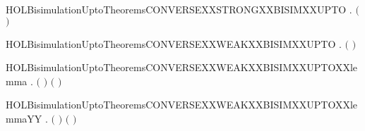 \newcommand{\HOLBisimulationUptoTheoremsCONVERSEXXOBSXXBISIMXXUPTO}{\UseVerbatim{HOLBisimulationUptoTheoremsCONVERSEXXOBSXXBISIMXXUPTO}}
\begin{SaveVerbatim}{HOLBisimulationUptoTheoremsCONVERSEXXSTRONGXXBISIMXXUPTO}
\HOLTokenTurnstile{} \HOLSymConst{\HOLTokenForall{}}.
         \HOLSymConst{\HOLTokenImp{}}  \ensuremath{(} \ensuremath{)}
\end{SaveVerbatim}
\newcommand{\HOLBisimulationUptoTheoremsCONVERSEXXSTRONGXXBISIMXXUPTO}{\UseVerbatim{HOLBisimulationUptoTheoremsCONVERSEXXSTRONGXXBISIMXXUPTO}}
\begin{SaveVerbatim}{HOLBisimulationUptoTheoremsCONVERSEXXWEAKXXBISIMXXUPTO}
\HOLTokenTurnstile{} \HOLSymConst{\HOLTokenForall{}}.   \HOLSymConst{\HOLTokenImp{}}  \ensuremath{(} \ensuremath{)}
\end{SaveVerbatim}
\newcommand{\HOLBisimulationUptoTheoremsCONVERSEXXWEAKXXBISIMXXUPTO}{\UseVerbatim{HOLBisimulationUptoTheoremsCONVERSEXXWEAKXXBISIMXXUPTO}}
\begin{SaveVerbatim}{HOLBisimulationUptoTheoremsCONVERSEXXWEAKXXBISIMXXUPTOXXlemma}
\HOLTokenTurnstile{} \HOLSymConst{\HOLTokenForall{}}  .
       \ensuremath{(}     \ensuremath{)}   \HOLSymConst{\HOLTokenEquiv{}}
       \ensuremath{(}    \ensuremath{)}  
\end{SaveVerbatim}
\newcommand{\HOLBisimulationUptoTheoremsCONVERSEXXWEAKXXBISIMXXUPTOXXlemma}{\UseVerbatim{HOLBisimulationUptoTheoremsCONVERSEXXWEAKXXBISIMXXUPTOXXlemma}}
\begin{SaveVerbatim}{HOLBisimulationUptoTheoremsCONVERSEXXWEAKXXBISIMXXUPTOXXlemmaYY}
\HOLTokenTurnstile{} \HOLSymConst{\HOLTokenForall{}}  .
       \ensuremath{(}     \ensuremath{)}   \HOLSymConst{\HOLTokenEquiv{}}
       \ensuremath{(}    \ensuremath{)}  
\end{SaveVerbatim}
